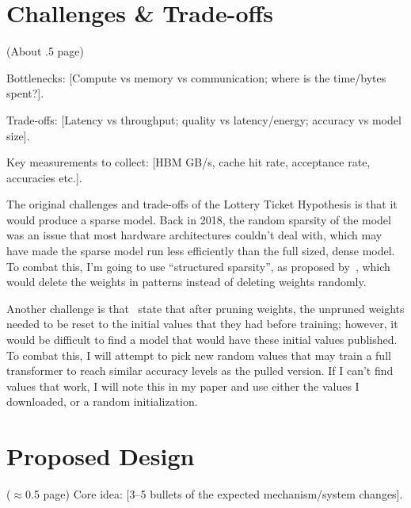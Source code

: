 \documentclass[
	title={Project Proposal}
]{cs595project}
\begin{document}
\section{Challenges \& Trade-offs}\label{sec:challenges-&-trade-offs}
\ifdetails
(About .5 page)

Bottlenecks: [Compute vs memory vs communication; where is the time/bytes spent?].

Trade-offs: [Latency vs throughput; quality vs latency/energy; accuracy vs model size].

Key measurements to collect: [HBM GB/s, cache hit rate, acceptance rate, accuracies etc.].
\fi

The original challenges and trade-offs of the Lottery Ticket Hypothesis is that it would produce a sparse model.
Back in 2018, the random sparsity of the model was an issue that most hardware architectures couldn't deal with, which may have made the sparse model run less efficiently than the full sized, dense model.
To combat this, I'm going to use ``structured sparsity'', as proposed by~\citeauthor{Medium}, which would delete the weights in patterns instead of deleting weights randomly.

Another challenge is that~\citeauthor{Lottery-Ticket-Hypothesis} state that after pruning weights, the unpruned weights needed to be reset to the initial values that they had before training; however, it would be difficult to find a model that would have these initial values published.
To combat this, I will attempt to pick new random values that may train a full transformer to reach similar accuracy levels as the pulled version.
If I can't find values that work, I will note this in my paper and use either the values I downloaded, or a random initialization.

\section{Proposed Design}\label{sec:proposed-design}
\ifdetails
($\approx$0.5 page)
Core idea: [3–5 bullets of the expected mechanism/system changes].
\end{document}
